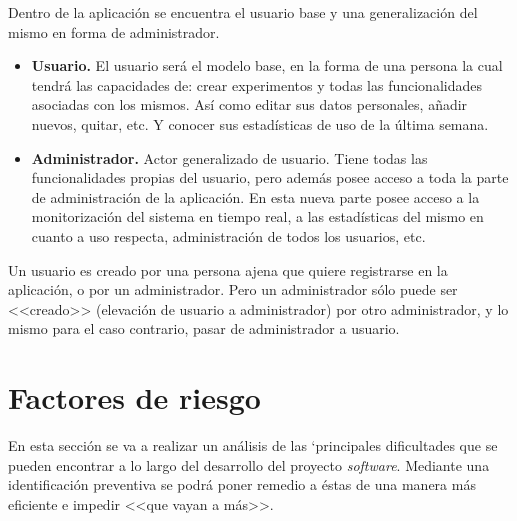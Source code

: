 Dentro de la aplicación se encuentra el usuario base y una generalización del mismo en forma de administrador. 
\begin{itemize}
\item \textbf{Usuario.} El usuario será el modelo base, en la forma de una persona la cual tendrá las capacidades de: crear experimentos y todas las funcionalidades asociadas con los mismos. Así como editar sus datos personales, añadir nuevos, quitar, etc. Y conocer sus estadísticas de uso de la última semana.

\item \textbf{Administrador.} Actor generalizado de usuario. Tiene todas las funcionalidades propias del usuario, pero además posee acceso a toda la parte de administración de la aplicación. En esta nueva parte posee acceso a la monitorización del sistema en tiempo real, a las estadísticas del mismo en cuanto a uso respecta, administración de todos los usuarios, etc. 
\end{itemize}

Un usuario es creado por una persona ajena que quiere registrarse en la aplicación, o por un administrador. Pero un administrador sólo puede ser <<creado>> (elevación de usuario a administrador) por otro administrador, y lo mismo para el caso contrario, pasar de administrador a usuario.


\section{Factores de riesgo}\label{factores-de-riesgo}
En esta sección se va a realizar un análisis de las `principales dificultades que se pueden encontrar a lo largo del desarrollo del proyecto \textit{software}. Mediante una identificación preventiva se podrá poner remedio a éstas de una manera más eficiente e impedir <<que vayan a más>>.

